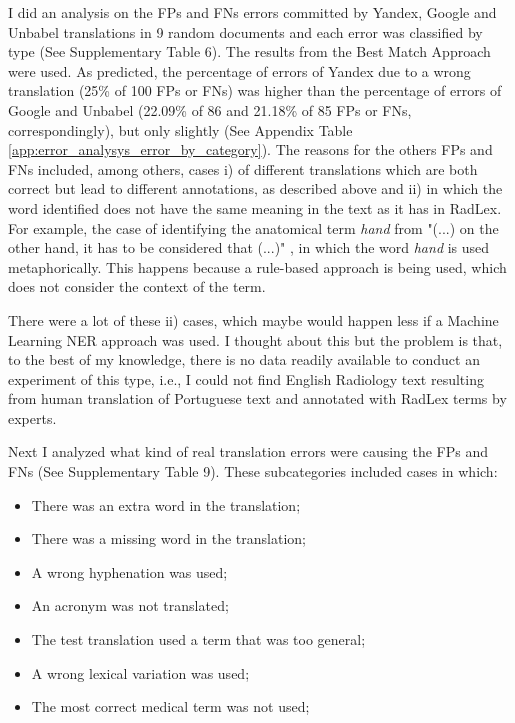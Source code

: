 I did an analysis on the FPs and FNs errors committed by Yandex, Google and Unbabel translations in 9 random documents and each error was classified by type (See Supplementary Table 6). The results from the Best Match Approach were used. As predicted, the percentage of errors of Yandex due to a wrong translation (25\% of 100 FPs or FNs) was higher than the percentage of errors of Google and Unbabel (22.09\% of 86 and 21.18\% of 85 FPs or FNs, correspondingly), but only slightly (See Appendix Table \ref{app:error_analysys_error_by_category}). The reasons for the others FPs and FNs included, among others, cases i) of different translations which are both correct but lead to different annotations, as described above and ii) in which the word identified does not have the same meaning in the text as it has in RadLex. For example, the case of identifying the anatomical term \textit{hand} from "(...) on the other hand, it has to be considered that (...)" , in which the word \textit{hand} is used metaphorically. This happens because a rule-based approach is being used, which does not consider the context of the term. 

There were a lot of these ii) cases, which maybe would happen less if a Machine Learning NER approach was used. I thought about this but the problem is that, to the best of my knowledge, there is no data  readily available to conduct an experiment of this type, i.e., I could not find English Radiology text resulting from human translation of Portuguese text and annotated with RadLex terms by experts. 

Next I analyzed what kind of real translation errors were causing the FPs and FNs (See Supplementary Table 9). These subcategories included cases in which:

\begin{itemize}
	\item There was an extra word in the translation;
	\item There was a missing word in the translation;
	\item A wrong hyphenation was used;
	\item An acronym was not translated; 
	\item The test translation used a term that was too general;
	\item A wrong lexical variation was used;
	\item The most correct medical term was not used;
\end{itemize}

